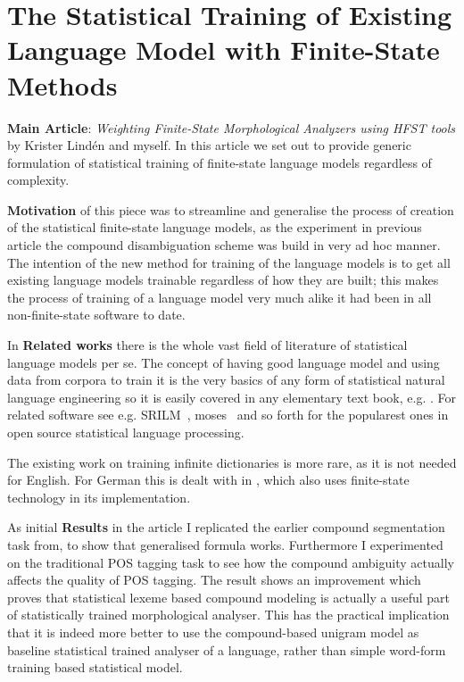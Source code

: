 \documentclass[officiallayout,draft]{unihelcompling}
\begin{document}
\section{The Statistical Training of Existing Language Model with Finite-State
Methods}

\textbf{Main Article}: \emph{Weighting Finite-State Morphological Analyzers
using HFST tools} by Krister Lindén and myself. In this article we set out
to provide generic formulation of statistical training of finite-state
language models regardless of complexity.

\textbf{Motivation} of this piece was to streamline and generalise the process
of creation of the statistical finite-state language models, as the experiment
in previous article \cite{pirinen2009weighted} the compound disambiguation
scheme was build in very ad hoc manner. The intention of the new method
for training of the language models is to get all existing language models
trainable regardless of how they are built; this makes the process of training
of a language model very much alike it had been in all non-finite-state
software to date.

In \textbf{Related works} there is the whole vast field of literature of
statistical language models per se. The concept of having good language model
and using data from corpora to train it is the very basics of any form of
statistical natural language engineering so it is easily covered in any
elementary text book, e.g. \cite{noppakirja}. For related software see e.g.
SRILM~\cite{srilm}, moses~\cite{moses} and so forth for the popularest ones
in open source statistical language processing.

The existing work on training infinite dictionaries is more rare, as it is not
needed for English. For German this is dealt with in \cite{schiller}, which
also uses finite-state technology in its implementation.

As initial \textbf{Results} in the article I replicated the earlier compound
segmentation task from, to show that generalised formula works.
Furthermore I experimented on the traditional POS tagging task to see how the
compound ambiguity actually affects the quality of POS tagging. The result
shows an improvement which proves that statistical lexeme based compound
modeling is actually a useful part of statistically trained morphological
analyser. This has the practical implication that it is indeed more better to
use the compound-based unigram model as baseline statistical trained analyser
of a language, rather than simple word-form training based statistical model.
\end{document}
